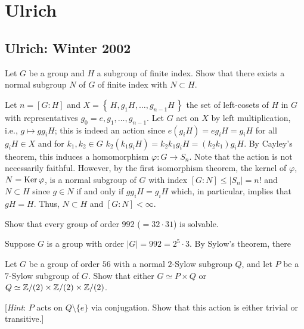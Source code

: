 \section{Ulrich}
\subsection{Ulrich: Winter 2002}
\setcounter{exercise}{0}
\setcounter{equation}{0}

\begin{problem}
  Let $G$ be a group and $H$ a subgroup of finite index. Show that there
  exists a normal subgroup $N$ of $G$ of finite index with $N\subset H$.
\end{problem}
\begin{solution}
  Let $n=[G:H]$ and $X=\left\{\,H,g_1H,\ldots,g_{n-1}H\,\right\}$ the set
  of left-cosets of $H$ in $G$ with representatives
  $g_0=e,g_1,\ldots,g_{n-1}$. Let $G$ act on $X$ by left multiplication,
  i.e., $g\mapsto g g_iH$; this is indeed an action since
  $e(g_iH)=eg_iH=g_iH$ for all $g_iH\in X$ and for $k_1,k_2\in G$
  $k_2(k_1g_iH)=k_2k_1g_iH=(k_2k_1)g_iH$. By Cayley's theorem, this induces
  a homomorphism $\varphi\colon G\to S_n$. Note that the action is not
  necessarily faithful. However, by the first isomorphism theorem, the
  kernel of $\varphi$, $N=\operatorname{Ker}\varphi$, is a normal subgroup of $G$ with
  index $[G:N]\leq |S_n|=n!$ and $N\subset H$ since $g\in N$ if and only if
  $gg_iH=g_iH$ which, in particular, implies that $gH=H$. Thus, $N\subset
  H$ and $[G:N]<\infty$.
\end{solution}

\begin{problem}
  Show that every group of order $992$ ($=32\cdot 31$) is solvable.
\end{problem}
\begin{solution}
  Suppose $G$ is a group with order $|G|=992=2^5\cdot 3$. By Sylow's
  theorem, there
\end{solution}

\begin{problem}
  Let $G$ be a group of order $56$ with a normal $2$-Sylow subgroup $Q$,
  and let $P$ be a $7$-Sylow subgroup of $G$. Show that either $G\simeq
  P\times Q$ or $Q\simeq\mathbb{Z}/(2)\times\mathbb{Z}/(2)\times\mathbb{Z}/(2)$.

  [\emph{Hint}: $P$ acts on $Q\setminus\{e\}$ via conjugation. Show
  that this action is either trivial or transitive.]
\end{problem}
\begin{solution}
\end{solution}


